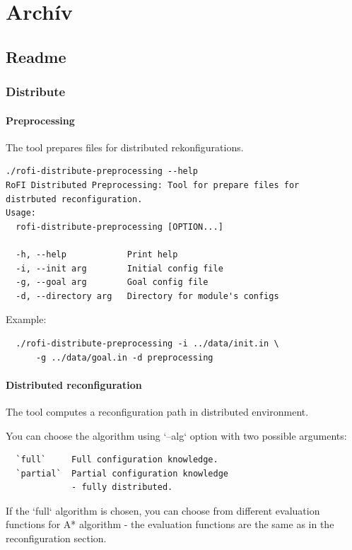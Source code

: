 \documentclass[
  digital, %
  oneside, %
  notable,   %
  lof,     %
  nolot,     %
]{fithesis3}
\begin{document}
\chapter{Archív}

\section{Readme}
\label{sec:readme}
\subsection*{Distribute}
\subsubsection*{Preprocessing}

The tool prepares files for distributed rekonfigurations. 

\begin{verbatim}
./rofi-distribute-preprocessing --help
RoFI Distributed Preprocessing: Tool for prepare files for 
distrbuted reconfiguration. 
Usage: 
  rofi-distribute-preprocessing [OPTION...]

  -h, --help            Print help
  -i, --init arg        Initial config file
  -g, --goal arg        Goal config file
  -d, --directory arg   Directory for module's configs
\end{verbatim}

Example: 

\begin{verbatim}
  ./rofi-distribute-preprocessing -i ../data/init.in \
      -g ../data/goal.in -d preprocessing
\end{verbatim}

\subsubsection*{Distributed reconfiguration}

The tool computes a reconfiguration path in distributed environment. 

You can choose the algorithm using `--alg` option with two possible arguments:

\begin{verbatim}
  `full`     Full configuration knowledge.
  `partial`  Partial configuration knowledge 
             - fully distributed. 
\end{verbatim}

If the `full` algorithm is chosen, you can choose from different evaluation functions for A* algorithm - the evaluation functions are the same as in the reconfiguration section. 
\end{document}
